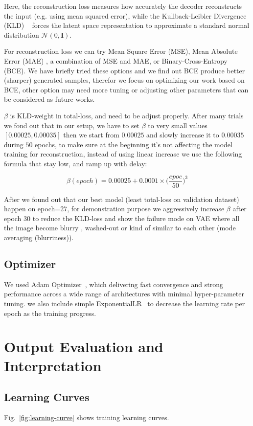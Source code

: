 \documentclass[stu, 12pt, floatsintext]{apa7}
\begin{document}
Here, the reconstruction loss measures how accurately the decoder reconstructs the input (e.g. using mean squared error),
while the Kullback-Leibler Divergence ($\text{KLD}$) ~\parencite{enwiki:kld} forces
the latent space representation to approximate a standard normal distribution $\mathcal{N}(0, \mathbf{I})$.

For reconstruction loss we can try Mean Square Error (MSE), Mean Absolute Error (MAE) , a combination of MSE and MAE, or Binary-Cross-Entropy (BCE). We have briefly tried these options and we find out BCE produce better (sharper) generated samples, therefor we focus on optimizing our work based on BCE, other option may need more tuning or adjusting other parameters that can be considered as future works.

$\beta$ is KLD-weight in total-loss, and need to be adjust properly. After many trials we fond out that in our setup, we have to set $\beta$ to very small values $[ 0.00025,  0.00035]$ then we start from $ 0.00025$ and slowly increase it to $0.00035$ during $50$ epochs, to make sure at the beginning it's not affecting the model training for reconstruction, instead of using linear increase we use the following formula that stay low, and ramp up with delay:

$$\beta(epoch) = 0.00025 + 0.0001\times\Big(\frac{epoc}{50}\Big)^3$$

After we found out that our best model (least total-loss on validation dataset) happen on epoch=27, for demonstration purpose we aggressively increase $\beta$ after epoch $30$ to reduce the KLD-loss and show the failure mode on VAE where all the image become blurry , washed-out  or kind of similar to each other (mode averaging (blurriness)).

\subsection{Optimizer}
We used Adam Optimizer~\parencite{Adam-pytorch}, which delivering fast convergence and strong performance across a wide range of architectures with minimal hyper-parameter tuning. we also include simple ExponentialLR~\parencite{scheduler-pytorch} to decrease the learning rate per epoch as the training progress.

\section{Output Evaluation and Interpretation}
\subsection{Learning Curves}
Fig.~\ref{fig:learning-curve} shows training learning curves.
\end{document}
